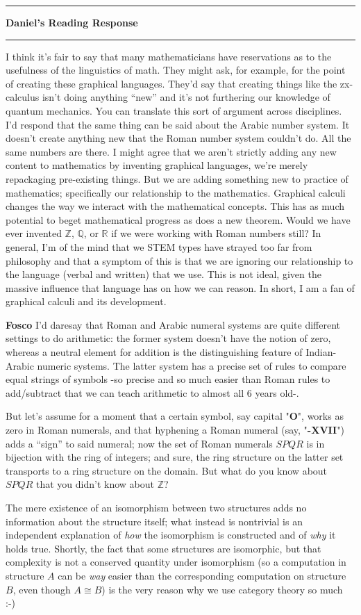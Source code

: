 \documentclass{amsart}
\newcommand{\iam}[1]{
  \vspace{0.25em}
  \hrule
  \vspace{0.25em}
  \textbf{{#1}'s Reading Response}
  \vspace{0.25em}
  \hrule
  \vspace{1em}
}
\newcommand{\respond}[1]{
  \vspace{1em} \textbf{#1}
}
\begin{document}
\iam{Daniel}

I think it's fair to say that many mathematicians
have reservations as to the usefulness of the
linguistics of math.  They might ask, for example,
for the point of creating these graphical
languages. They'd say that creating things like
the zx-calculus isn't doing anything ``new'' and
it's not furthering our knowledge of quantum
mechanics. You can translate this sort of argument
across disciplines. I'd respond that the same
thing can be said about the Arabic number
system. It doesn't create anything new that the
Roman number system couldn't do. All the same
numbers are there. I might agree that we aren't
strictly adding any new content to mathematics by
inventing graphical languages, we're merely
repackaging pre-existing things.  But we are
adding something new to practice of mathematics;
specifically our relationship to the
mathematics. Graphical calculi changes the way we
interact with the mathematical concepts. This has
as much potential to beget mathematical progress
as does a new theorem.  Would we have ever
invented $ \mathbb{Z} $, $ \mathbb{Q} $, or
$ \mathbb{R} $ if we were working with Roman
numbers still?  In general, I'm of the mind that
we STEM types have strayed too far from philosophy
and that a symptom of this is that we are ignoring
our relationship to the language (verbal and
written) that we use.  This is not ideal, given
the massive influence that language has on how we
can reason. In short, I am a fan of graphical
calculi and its development.

\respond{Fosco} I'd daresay that Roman and Arabic numeral systems are quite different settings to do arithmetic: the former system doesn't have the notion of zero, whereas a neutral element for addition is the distinguishing feature of Indian-Arabic numeric systems. The latter system has a precise set of rules to compare equal strings of symbols -so precise and so much easier than Roman rules to add/subtract that we can teach arithmetic to almost all 6 years old-.

But let's assume for a moment that a certain symbol, say capital "{\bf O}", works as zero in Roman numerals, and that hyphening a Roman numeral (say, "{\bf -XVII}") adds a ``sign'' to said numeral; now the set of Roman numerals $SPQR$ is in bijection with the ring of integers; and sure, the ring structure on the latter set transports to a ring structure on the domain. But what do you know about $SPQR$ that you didn't know about $\mathbb Z$?

The mere existence of an isomorphism between two structures adds no information about the structure itself; what instead is nontrivial is an independent explanation of \emph{how} the isomorphism is constructed and of \emph{why} it holds true. Shortly, the fact that some structures are isomorphic, but that complexity is not a conserved quantity under isomorphism (so a computation in structure $A$ can be \emph{way} easier than the corresponding computation on structure $B$, even though $A\cong B$) is the very reason why we use category theory so much :-)
\end{document}
